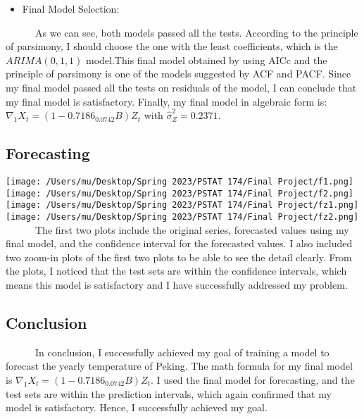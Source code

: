 \documentclass[
]{article}
\providecommand{\tightlist}{%
  \setlength{\itemsep}{0pt}\setlength{\parskip}{0pt}}
\begin{document}
\begin{itemize}
\tightlist
\item
  Final Model Selection:
\end{itemize}

~~~~~~As we can see, both models passed all the tests. According to the
principle of parsimony, I should choose the one with the least
coefficients, which is the \(ARIMA(0,1,1)\) model.This final model
obtained by using AICc and the principle of parsimony is one of the
models suggested by ACF and PACF. Since my final model passed all the
tests on residuals of the model, I can conclude that my final model is
satisfactory. Finally, my final model in algebraic form is:
\(\nabla_1X_t = (1-0.7186_{0.0742}B)Z_t\) with
\(\hat{\sigma}^2_Z = 0.2371\).

\hypertarget{forecasting}{%
\subsection{Forecasting}\label{forecasting}}

\texttt{[image: /Users/mu/Desktop/Spring 2023/PSTAT 174/Final Project/f1.png]}
\texttt{[image: /Users/mu/Desktop/Spring 2023/PSTAT 174/Final Project/f2.png]}
\texttt{[image: /Users/mu/Desktop/Spring 2023/PSTAT 174/Final Project/fz1.png]}
\texttt{[image: /Users/mu/Desktop/Spring 2023/PSTAT 174/Final Project/fz2.png]}\\

~~~~~~The first two plots include the original series, forecasted values
using my final model, and the confidence interval for the forecasted
values. I also included two zoom-in plots of the first two plots to be
able to see the detail clearly. From the plots, I noticed that the test
sets are within the confidence intervals, which means this model is
satisfactory and I have successfully addressed my problem.

\hypertarget{conclusion}{%
\subsection{Conclusion}\label{conclusion}}

~~~~~~In conclusion, I successfully achieved my goal of training a model
to forecast the yearly temperature of Peking. The math formula for my
final model is \(\nabla_1X_t = (1-0.7186_{0.0742}B)Z_t\). I used the
final model for forecasting, and the test sets are within the prediction
intervals, which again confirmed that my model is satisfactory. Hence, I
successfully achieved my goal.
\end{document}
